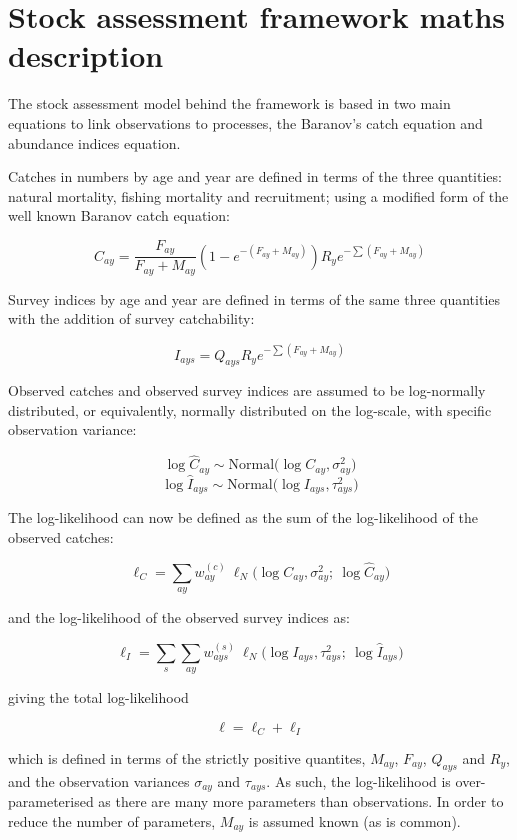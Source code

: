 \documentclass[a4paper,english,11pt]{article}
\begin{document}
\section{Stock assessment framework maths description}\label{sec:math}

The stock assessment model behind the framework is based in two main equations to link observations to processes, the Baranov's catch equation and abundance indices equation.

Catches in numbers by age and year are defined in terms of the three quantities: natural mortality, fishing mortality and recruitment; using a modified form of the well known Baranov catch equation:

$$C_{ay} = \frac{F_{ay}}{F_{ay}+M_{ay}}\left(1 - e^{-(F_{ay}+M_{ay})}\right) R_{y}e^{-\sum (F_{ay} + M_{ay})} $$

Survey indices by age and year are defined in terms of the same three quantities with the addition of survey catchability:

$$I_{ays} = Q_{ays} R_{y}e^{-\sum (F_{ay} + M_{ay})}$$

Observed catches and observed survey indices are assumed to be log-normally distributed, or equivalently, normally distributed on the log-scale, with specific observation variance:

$$ \log \hat{C}_{ay} \sim \text{Normal} \Big( \log C_{ay}, \sigma^2_{ay}\Big) $$
$$ \log \hat{I}_{ays} \sim \text{Normal} \Big( \log I_{ays}, \tau^2_{ays} \Big) $$

The log-likelihood can now be defined as the sum of the log-likelihood of the observed catches:

$$  \ell_C = \sum_{ay} w^{(c)}_{ay}\ \ell_N \Big( \log C_{ay}, \sigma^2_{ay} ;\ \log \hat{C}_{ay} \Big) $$

and the log-likelihood of the observed survey indices as:

$$  \ell_I = \sum_s \sum_{ay} w^{(s)}_{ays}\ \ell_N \Big( \log I_{ays}, \tau_{ays}^2 ;\ \log \hat{I}_{ays} \Big)$$

giving the total log-likelihood

$$\ell = \ell_C + \ell_I$$

which is defined in terms of the strictly positive quantites, $M_{ay}$, $F_{ay}$, $Q_{ays}$ and $R_{y}$, and the observation variances $\sigma_{ay}$ and $\tau_{ays}$. As such, the log-likelihood is over-parameterised as there are many more parameters than observations. In order to reduce the number of parameters, $M_{ay}$ is assumed known (as is common). 
\end{document}
